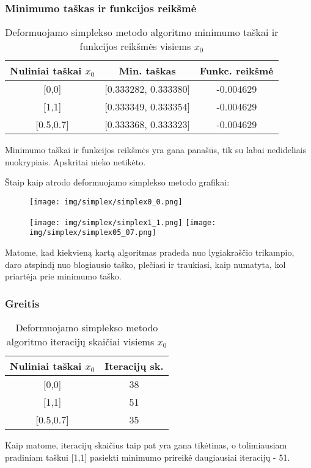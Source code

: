 \documentclass{article}
\begin{document}
\subsubsection{Minimumo taškas ir funkcijos reikšmė}
\begin{table}[H]
    \centering
    \begin{tabular}{|c|c|c|} 
    \hline
    Nuliniai taškai $x_{0}$ & Min. taškas            & Funkc. reikšmė  \\ 
    \hline
    {[}0,0]            & {[}0.333282, 0.333380] & -0.004629       \\ 
    \hline
    {[}1,1]            & {[}0.333349, 0.333354] & -0.004629       \\ 
    \hline
    {[}0.5,0.7]        & {[}0.333368, 0.333323] & -0.004629       \\
    \hline
    \end{tabular}
    \caption{Deformuojamo simplekso metodo algoritmo minimumo taškai ir funkcijos reikšmės visiems $x_{0}$}
    \label{table:7}
\end{table}
Minimumo taškai ir funkcijos reikšmės yra gana panašūs, tik su labai nedideliais nuokrypiais. Apskritai nieko netikėto.

Štaip kaip atrodo deformuojamo simplekso metodo grafikai:
\begin{figure}[H]
    \begin{adjustbox}{margin=0pt,center}
        \texttt{[image: img/simplex/simplex0\_0.png]}
    \end{adjustbox}
\end{figure}
\begin{figure}[H]
    \begin{adjustbox}{margin=0pt,center}
        \texttt{[image: img/simplex/simplex1\_1.png]}%
        \texttt{[image: img/simplex/simplex05\_07.png]}
    \end{adjustbox}
\end{figure}
Matome, kad kiekvieną kartą algoritmas pradeda nuo lygiakraščio trikampio, daro atspindį nuo blogiausio taško, plečiasi ir traukiasi, kaip numatyta, kol priartėja prie minimumo taško.
\subsubsection{Greitis}
\begin{table}[H]
    \centering
    \begin{tabular}{|c|c|} 
    \hline
    Nuliniai taškai $x_{0}$ & Iteracijų sk.  \\ 
    \hline
    {[}0,0]            & 38             \\ 
    \hline
    {[}1,1]            & 51             \\ 
    \hline
    {[}0.5,0.7]        & 35             \\
    \hline
    \end{tabular}
    \caption{Deformuojamo simplekso metodo algoritmo iteracijų skaičiai visiems $x_{0}$}
    \label{table:8}
\end{table}
Kaip matome, iteracijų skaičius taip pat yra gana tikėtinas, o tolimiausiam pradiniam taškui [1,1] pasiekti minimumo prireikė daugiausiai iteracijų - 51.
\end{document}
